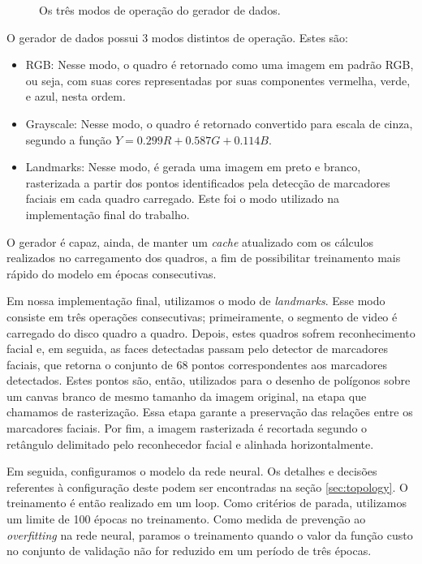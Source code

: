 \begin{figure}[ht]
    \centering
    
    
    
    \caption{Os três modos de operação do gerador de dados.}
    \label{fig:train_metrics_evo}
\end{figure}

O gerador de dados possui 3 modos distintos de operação. Estes são:
\begin{itemize}
    \item RGB: Nesse modo, o quadro é retornado como uma imagem em padrão RGB, ou seja, com suas cores representadas por suas componentes vermelha, verde, e azul, nesta ordem.
    \item Grayscale: Nesse modo, o quadro é retornado convertido para escala de cinza, segundo a função $Y = 0.299 R + 0.587 G + 0.114 B$.
    \item Landmarks: Nesse modo, é gerada uma imagem em preto e branco, rasterizada a partir dos pontos identificados pela detecção de marcadores faciais em cada quadro carregado. Este foi o modo utilizado na implementação final do trabalho.
\end{itemize}
O gerador é capaz, ainda, de manter um \textit{cache} atualizado com os cálculos realizados no carregamento dos quadros, a fim de possibilitar treinamento mais rápido do modelo em épocas consecutivas.

Em nossa implementação final, utilizamos o modo de \textit{landmarks}. Esse modo consiste em três operações consecutivas; primeiramente, o segmento de video é carregado do disco quadro a quadro. Depois, estes quadros sofrem reconhecimento facial e, em seguida, as faces detectadas passam pelo detector de marcadores faciais, que retorna o conjunto de 68 pontos correspondentes aos marcadores detectados. Estes pontos são, então, utilizados para o desenho de polígonos sobre um canvas branco de mesmo tamanho da imagem original, na etapa que chamamos de rasterização. Essa etapa garante a preservação das relações entre os marcadores faciais. Por fim, a imagem rasterizada é recortada segundo o retângulo delimitado pelo reconhecedor facial e alinhada horizontalmente.

Em seguida, configuramos o modelo da rede neural. Os detalhes e decisões referentes à configuração deste podem ser encontradas na seção \ref{sec:topology}. O treinamento é então realizado em um loop. Como critérios de parada, utilizamos um limite de 100 épocas no treinamento. Como medida de prevenção ao \textit{overfitting} na rede neural, paramos o treinamento quando o valor da função custo no conjunto de validação não for reduzido em um período de três épocas.

